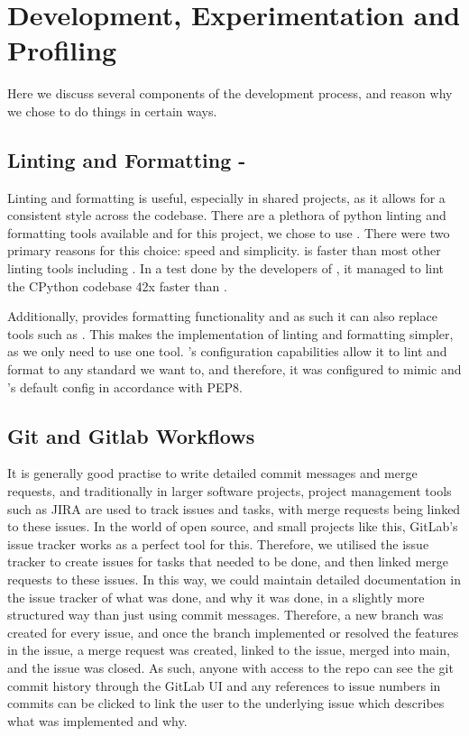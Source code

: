 
\section{Development, Experimentation and Profiling}\label{sec:development-experimentation-and-profiling}
Here we discuss several components of the development process, and reason why we chose to do things in certain ways.

\subsection{Linting and Formatting - }\label{subsec:linting-and-formatting}
    Linting and formatting is useful, especially in shared projects, as it allows for a consistent style across the codebase.
    There are a plethora of python linting and formatting tools available and for this project, we chose to use .
    There were two primary reasons for this choice: speed and simplicity.
     is faster than most other linting tools including .
    In a test done by the developers of , it managed to lint the CPython codebase 42x faster than
     \cite{ruff-repo}.

    Additionally,  provides formatting functionality and as such it can also replace tools such as
    .
    This makes the implementation of linting and formatting simpler, as we only need to use one tool.
    's configuration capabilities allow it to lint and format to any standard we want to, and therefore,
    it was configured to mimic  and 's default config in accordance with PEP8.

    \subsection{Git and Gitlab Workflows}\label{subsec:git-and-gitlab-pipeline}
    It is generally good practise to write detailed commit messages and merge requests, and traditionally in larger
    software projects, project management tools such as JIRA are used to track issues and tasks, with merge requests
    being linked to these issues.
    In the world of open source, and small projects like this, GitLab's issue tracker works as a perfect tool for this.
    Therefore, we utilised the issue tracker to create issues for tasks that needed to be done, and then linked merge requests
    to these issues.
    In this way, we could maintain detailed documentation in the issue tracker of what was done, and why it was done,
    in a slightly more structured way than just using commit messages.
    Therefore, a new branch was created for every issue, and once the branch implemented or resolved the features in the
    issue, a merge request was created, linked to the issue, merged into main, and the issue was closed.
    As such, anyone with access to the repo can see the git commit history through the GitLab UI and any references to issue
    numbers in commits can be clicked to link the user to the underlying issue which describes what was implemented and why.

